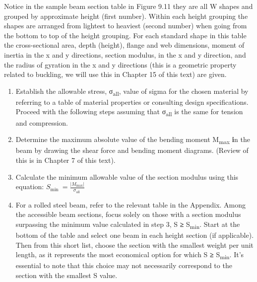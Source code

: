 \documentclass[
  letterpaper,
  DIV=11,
  numbers=noendperiod]{scrreprt}
\providecommand{\tightlist}{%
  \setlength{\itemsep}{0pt}\setlength{\parskip}{0pt}}\usepackage{longtable,booktabs,array}
\begin{document}
Notice in the sample beam section table in Figure 9.11 they are all W
shapes and grouped by approximate height (first number). Within each
height grouping the shapes are arranged from lightest to heaviest
(second number) when going from the bottom to top of the height
grouping. For each standard shape in this table the cross-sectional
area, depth (height), flange and web dimensions, moment of inertia in
the x and y directions, section modulus, in the x and y direction, and
the radius of gyration in the x and y directions (this is a geometric
property related to buckling, we will use this in Chapter 15 of this
text) are given.

\begin{tcolorbox}[enhanced jigsaw, colbacktitle=quarto-callout-note-color!10!white, title={Step-by-step: Most Economical Beam Design (standard shapes)}, coltitle=black, leftrule=.75mm, rightrule=.15mm, opacityback=0, breakable, colframe=quarto-callout-note-color-frame, left=2mm, arc=.35mm, colback=white, bottomrule=.15mm, bottomtitle=1mm, toptitle=1mm, titlerule=0mm, opacitybacktitle=0.6, toprule=.15mm]

\begin{enumerate}
\def\labelenumi{\arabic{enumi}.}
\tightlist
\item
  Establish the allowable stress, σ\textsubscript{all}, value of sigma
  for the chosen material by referring to a table of material properties
  or consulting design specifications. Proceed with the following steps
  assuming that σ\textsubscript{all} is the same for tension and
  compression.
\item
  Determine the maximum absolute value of the bending moment
  \textbar M\textsubscript{max}\textbar{} \textbf{i}n the beam by
  drawing the shear force and bending moment diagrams. (Review of this
  is in Chapter 7 of this text).
\item
  Calculate the minimum allowable value of the section modulus using
  this equation:
  \(S_{\text {min }}=\frac{\left|M_{\max }\right|}{\sigma_{\text {all }}}\)
\item
  For a rolled steel beam, refer to the relevant table in the Appendix.
  Among the accessible beam sections, focus solely on those with a
  section modulus surpassing the minimum value calculated in step 3, S
  \textbf{≥} S\textsubscript{min}. Start at the bottom of the table and
  select one beam in each height section (if applicable). Then from this
  short list, choose the section with the smallest weight per unit
  length, as it represents the most economical option for which S
  \textbf{≥} S\textsubscript{min}. It's essential to note that this
  choice may not necessarily correspond to the section with the smallest
  S value.
\end{enumerate}

\end{tcolorbox}
\end{document}
